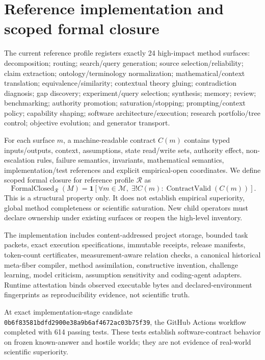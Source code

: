 \documentclass[11pt]{article}
\newcommand{\SoftwareTests}{614}
\newcommand{\ImplementationSHA}{\texttt{0b6f83581bdfd2900e38a9b6af4672ac03b75f39}}
\begin{document}
\section{Reference implementation and scoped formal closure}
The current reference profile registers exactly 24 high-impact method surfaces: decomposition; routing; search/query generation; source selection/reliability; claim extraction; ontology/terminology normalization; mathematical/context translation; equivalence/similarity; contextual theory gluing; contradiction diagnosis; gap discovery; experiment/query selection; synthesis; memory; review; benchmarking; authority promotion; saturation/stopping; prompting/context policy; capability shaping; software architecture/execution; research portfolio/tree control; objective evolution; and generator transport.

For each surface $m$, a machine-readable contract $C(m)$ contains typed inputs/outputs, context, assumptions, state read/write sets, authority effect, non-escalation rules, failure semantics, invariants, mathematical semantics, implementation/test references and explicit empirical-open coordinates. We define scoped formal closure for reference profile $\mathcal R$ as
\begin{equation}\operatorname{FormalClosed}_{\mathcal R}(M)=\mathbf 1\!\left[\forall m\in\mathcal M,\;\exists!C(m):\operatorname{ContractValid}(C(m))\right].\end{equation}
This is a structural property only. It does not establish empirical superiority, global method completeness or scientific saturation. New child operators must declare ownership under existing surfaces or reopen the high-level inventory.

The implementation includes content-addressed project storage, bounded task packets, exact execution specifications, immutable receipts, release manifests, token-count certificates, measurement-aware relation checks, a canonical historical meta-fiber compiler, method assimilation, constructive invention, challenge learning, model criticism, assumption sensitivity and coding-agent adapters. Runtime attestation binds observed executable bytes and declared-environment fingerprints as reproducibility evidence, not scientific truth.

At exact implementation-stage candidate \ImplementationSHA{}, the GitHub Actions workflow completed with \SoftwareTests{} passing tests. These tests establish software-contract behavior on frozen known-answer and hostile worlds; they are not evidence of real-world scientific superiority.
\end{document}
